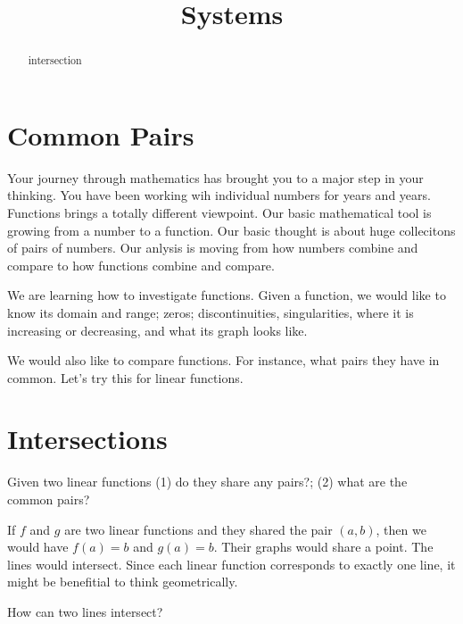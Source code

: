 \documentclass{ximera}
\title{Systems}
\begin{document}
\begin{abstract}
intersection
\end{abstract}
\maketitle



\section{Common Pairs}

Your journey through mathematics has brought you to a major step in your thinking. You have been working wih individual numbers for years and years. Functions brings a totally different viewpoint. Our basic mathematical tool is growing from a number to a function.  Our basic thought is about huge collecitons of pairs of numbers.  Our anlysis is moving from how numbers combine and compare to how functions combine and compare.

We are learning how to investigate functions.  Given a function, we would like to know its domain and range; zeros; discontinuities, singularities, where it is increasing or decreasing, and what its graph looks like.

We would also like to compare functions.  For instance, what pairs they have in common. Let's try this for linear functions.



\section{Intersections}

Given two linear functions (1) do they share any pairs?; (2) what are the common pairs?



If $f$ and $g$ are two linear functions and they shared the pair $(a, b)$, then we would have $f(a)=b$ and $g(a)=b$.  Their graphs would share a point. The lines would intersect. Since each linear function corresponds to exactly one line, it might be benefitial to think geometrically.  

How can two lines intersect?
\end{document}
